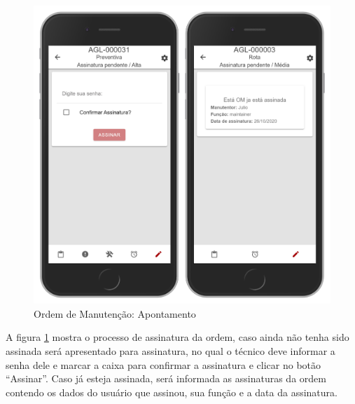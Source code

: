 \begin{figure}[H]
	\caption{\label{mobile-om-assinatura}Ordem de Manutenção: Apontamento}
	\begin{center}
		\includegraphics[scale=0.55]{./Figuras/agil.it/mobile-om-assinatura.jpg}
	\end{center}
\end{figure}

A figura \ref{mobile-om-assinatura} mostra o processo de assinatura da ordem, caso ainda não tenha sido assinada será apresentado para assinatura, no qual o técnico deve informar a senha dele e marcar a caixa para confirmar a assinatura e clicar no botão ``Assinar''. Caso já esteja assinada, será informada as assinaturas da ordem contendo os dados do usuário que assinou, sua função e a data da assinatura.